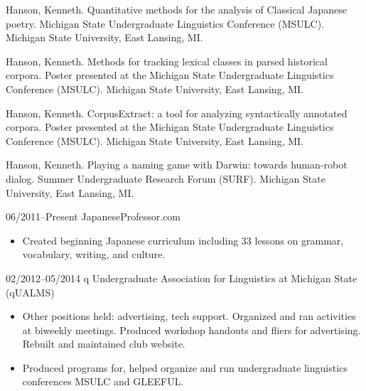 \documentclass[10pt,oneside]{article}
\begin{document}
\begin{publist}
	\item[2014] {Hanson, Kenneth. Quantitative methods for the analysis of Classical Japanese poetry. Michigan State Undergraduate Linguistics Conference (MSULC). Michigan State University, East Lansing, MI.}
	
	\item[2014] {Hanson, Kenneth. Methods for tracking lexical classes in parsed historical corpora. Poster presented at the Michigan State Undergraduate Linguistics Conference (MSULC). Michigan State University, East Lansing, MI.}
	
	\item[2013] {Hanson, Kenneth. CorpusExtract: a tool for analyzing syntactically annotated corpora. Poster presented at the Michigan State Undergraduate Linguistics Conference (MSULC). Michigan State University, East Lansing, MI.}
	
	\item[2012] {Hanson, Kenneth. Playing a naming game with Darwin: towards human-robot dialog. Summer Undergraduate Research Forum (SURF). Michigan State University, East Lansing, MI.}
\end{publist}



\begin{reslist}
		{06/2011--Present}
		{JapaneseProfessor.com}
		{}
	\begin{itemize}
		\item Created beginning Japanese curriculum including 33 lessons on grammar, vocabulary, writing, and culture.
	\end{itemize}
	
		{02/2012--05/2014}
		{q Undergraduate Association for Linguistics at Michigan State (qUALMS)}
		{}
	\begin{itemize}
		\item Other positions held: advertising, tech support. Organized and ran activities at biweekly meetings. Produced workshop handouts and fliers for advertising. Rebuilt and maintained club website.
		\item Produced programs for, helped organize and run undergraduate linguistics conferences MSULC and GLEEFUL. 
	\end{itemize}
\end{reslist}
\end{document}

